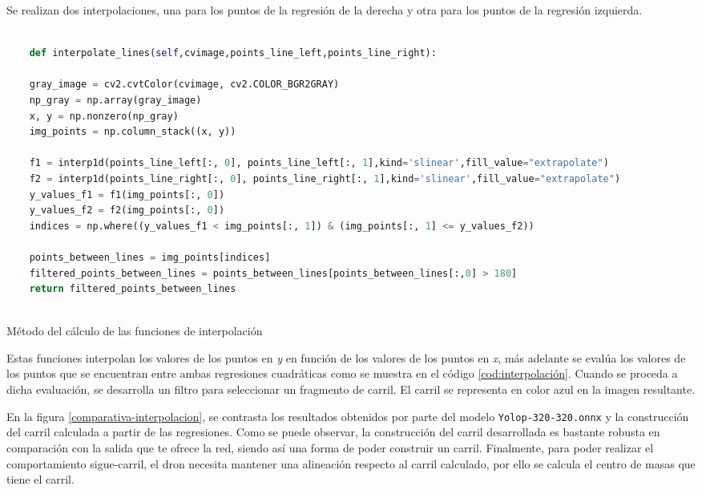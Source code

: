 Se realizan dos interpolaciones, una para 
los puntos de la regresión de la  derecha
y otra para los puntos de la regresión izquierda. 


\begin{code}[h]
  \begin{lstlisting}[language=Python]

    def interpolate_lines(self,cvimage,points_line_left,points_line_right):

    gray_image = cv2.cvtColor(cvimage, cv2.COLOR_BGR2GRAY) 
    np_gray = np.array(gray_image)
    x, y = np.nonzero(np_gray)
    img_points = np.column_stack((x, y))

    f1 = interp1d(points_line_left[:, 0], points_line_left[:, 1],kind='slinear',fill_value="extrapolate")
    f2 = interp1d(points_line_right[:, 0], points_line_right[:, 1],kind='slinear',fill_value="extrapolate") 
    y_values_f1 = f1(img_points[:, 0])
    y_values_f2 = f2(img_points[:, 0])
    indices = np.where((y_values_f1 < img_points[:, 1]) & (img_points[:, 1] <= y_values_f2))
    
    points_between_lines = img_points[indices]
    filtered_points_between_lines = points_between_lines[points_between_lines[:,0] > 180]
    return filtered_points_between_lines
    
  \end{lstlisting}
  \caption[Método de interpolación]{Método del cálculo de las funciones de interpolación}
  \label{cod:interpolación}
  \end{code}  

Estas funciones interpolan los valores de los puntos en \textit{y} en función de los valores de los puntos en \textit{x}, 
más adelante se evalúa los valores de los puntos que se encuentran entre 
ambas regresiones cuadráticas como se muestra en el código \ref{cod:interpolación}. Cuando se proceda a dicha evaluación, se desarrolla un filtro 
para seleccionar un fragmento de carril. El carril se representa en color azul en la imagen resultante.

En la figura \ref{comparativa-interpolacion}, se contrasta los resultados obtenidos por parte del modelo \texttt{Yolop-320-320.onnx} y la construcción del carril calculada a partir de las regresiones. 
Como se puede observar, la construcción del carril desarrollada es bastante robusta en comparación con la salida que te ofrece la red, siendo así una forma de poder construir un 
carril. Finalmente, para poder realizar el comportamiento sigue-carril, el dron necesita mantener una alineación respecto al carril calculado, por ello 
se calcula el centro de masas que tiene el carril.

